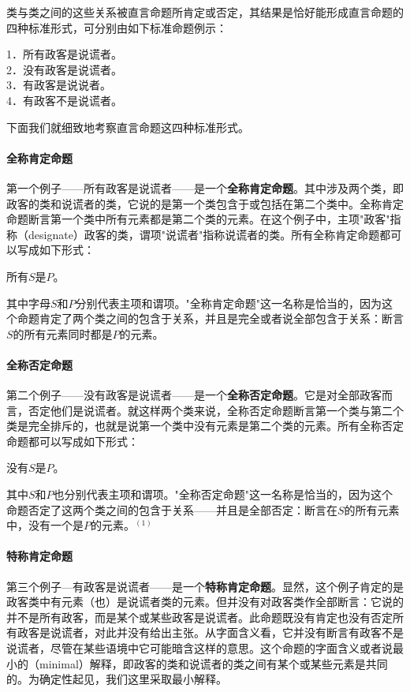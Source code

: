 类与类之间的这些关系被直言命题所肯定或否定，其结果是恰好能形成直言命题的四种标准形式，可分别由如下标准命题例示：

1．所有政客是说谎者。\\
2．没有政客是说谎者。\\
3．有政客是说说者。\\
4．有政客不是说谎者。

下面我们就细致地考察直言命题这四种标准形式。

\paragraph{全称肯定命题}
第一个例子——所有政客是说谎者——是一个\textbf{全称肯定命题}。其中涉及两个类，即政客的类和说谎者的类，它说的是第一个类包含于或包括在第二个类中。全称肯定命题断言第一个类中所有元素都是第二个类的元素。在这个例子中，主项"政客"指称（designate）政客的类，谓项"说谎者"指称说谎者的类。所有全称肯定命题都可以写成如下形式：

所有$S$是$P$。

其中字母$S$和$P$分别代表主项和谓项。"全称肯定命题"这一名称是恰当的，因为这个命题肯定了两个类之间的包含于关系，并且是完全或者说全部包含于关系：断言$S$的所有元素同时都是$P$的元素。

\paragraph{全称否定命题}
第二个例子——没有政客是说谎者——是一个\textbf{全称否定命题}。它是对全部政客而言，否定他们是说谎者。就这样两个类来说，全称否定命题断言第一个类与第二个类是完全排斥的，也就是说第一个类中没有元素是第二个类的元素。所有全称否定命题都可以写成如下形式：

没有$S$是$P$。

其中$S$和$P$也分别代表主项和谓项。"全称否定命题"这一名称是恰当的，因为这个命题否定了这两个类之间的包含于关系——并且是全部否定：断言在$S$的所有元素中，没有一个是$P$的元素。${ }^{(1)}$

\paragraph{特称肯定命题}
第三个例子—有政客是说谎者——是一个\textbf{特称肯定命题}。显然，这个例子肯定的是政客类中有元素（也）是说谎者类的元素。但并没有对政客类作全部断言：它说的并不是所有政客，而是某个或某些政客是说谎者。此命题既没有肯定也没有否定所有政客是说谎者，对此并没有给出主张。从字面含义看，它并没有断言有政客不是说谎者，尽管在某些语境中它可能暗含这样的意思。这个命题的字面含义或者说最小的（minimal）解释，即政客的类和说谎者的类之间有某个或某些元素是共同的。为确定性起见，我们这里采取最小解释。

